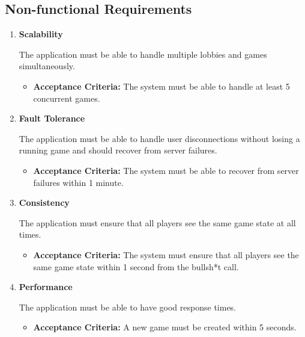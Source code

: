 \documentclass{scrartcl}
\begin{document}
\subsection{Non-functional Requirements}\label{non-functional-requirements}
\begin{enumerate}
      \item \textbf{Scalability}\par
            The application must be able to handle multiple lobbies and games simultaneously.
            \begin{itemize}
                  \item \textbf{Acceptance Criteria:} The system must be able to handle at least 5
                        concurrent games.
            \end{itemize}
      \item \textbf{Fault Tolerance}\par
            The application must be able to handle user disconnections without losing a running game
            and should recover from server failures.
            \begin{itemize}
                  \item \textbf{Acceptance Criteria:} The system must be able to recover from server
                        failures within 1 minute.
            \end{itemize}
      \item \textbf{Consistency}\par
            The application must ensure that all players see the same game state at all times.
            \begin{itemize}
                  \item \textbf{Acceptance Criteria:} The system must ensure that all players see the
                        same game state within 1 second from the bullsh*t call.
            \end{itemize}
      \item \textbf{Performance}\par
            The application must be able to have good response times.
            \begin{itemize}
                  \item \textbf{Acceptance Criteria:} A new game must be created within 5 seconds.
            \end{itemize}
\end{enumerate}
\end{document}
